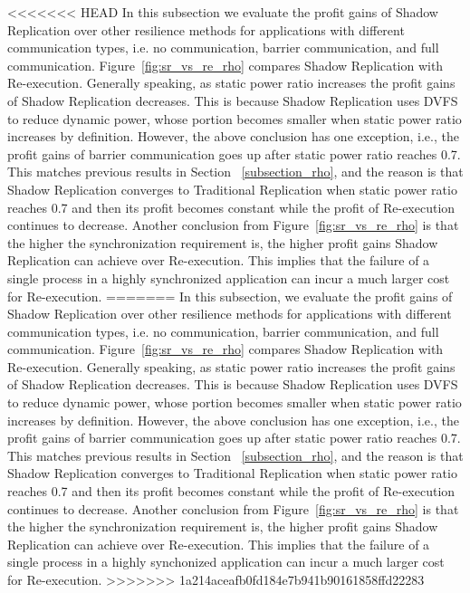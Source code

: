 <<<<<<< HEAD
In this subsection we evaluate the profit gains of Shadow Replication over other resilience methods for applications with different communication types, i.e. no communication, barrier communication, and full communication. Figure~\ref{fig:sr_vs_re_rho} compares Shadow Replication with Re-execution. Generally speaking, as static power ratio increases the profit gains of Shadow Replication decreases. This is because Shadow Replication uses DVFS to reduce dynamic power, whose portion becomes smaller when static power ratio increases by definition. However, the above conclusion has one exception, i.e., the profit gains of barrier communication goes up after static power ratio reaches 0.7. This matches previous results in Section ~\ref{subsection_rho}, and the reason is that Shadow Replication converges to Traditional Replication when static power ratio reaches 0.7 and then its profit becomes constant while the profit of Re-execution continues to decrease. Another conclusion from Figure~\ref{fig:sr_vs_re_rho} is that the higher the synchronization requirement is, the higher profit gains Shadow Replication can achieve over Re-execution. This implies that the failure of a single process in a highly synchronized application can incur a much larger cost for Re-execution.
=======
In this subsection, we evaluate the profit gains of Shadow Replication over other resilience methods for applications with different communication types, i.e. no communication, barrier communication, and full communication. Figure~\ref{fig:sr_vs_re_rho} compares Shadow Replication with Re-execution. Generally speaking, as static power ratio increases the profit gains of Shadow Replication decreases. This is because Shadow Replication uses DVFS to reduce dynamic power, whose portion becomes smaller when static power ratio increases by definition. However, the above conclusion has one exception, i.e., the profit gains of barrier communication goes up after static power ratio reaches 0.7. This matches previous results in Section ~\ref{subsection_rho}, and the reason is that Shadow Replication converges to Traditional Replication when static power ratio reaches 0.7 and then its profit becomes constant while the profit of Re-execution continues to decrease. Another conclusion from Figure~\ref{fig:sr_vs_re_rho} is that the higher the synchronization requirement is, the higher profit gains Shadow Replication can achieve over Re-execution. This implies that the failure of a single process in a highly synchonized application can incur a much larger cost for Re-execution.
>>>>>>> 1a214aceafb0fd184e7b941b90161858ffd22283

